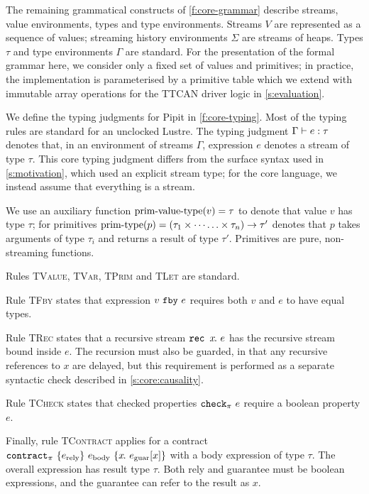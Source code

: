 The remaining grammatical constructs of \autoref{f:core-grammar} describe streams, value environments, types and type environments.
Streams $V$ are represented as a sequence of values; streaming history environments $\Sigma$ are streams of heaps.
Types $\tau$ and type environments $\Gamma$ are standard.
For the presentation of the formal grammar here, we consider only a fixed set of values and primitives; in practice, the implementation is parameterised by a primitive table which we extend with immutable array operations for the TTCAN driver logic in \autoref{s:evaluation}.



We define the typing judgments for Pipit in \autoref{f:core-typing}.
Most of the typing rules are standard for an unclocked Lustre.
The typing judgment $\Gamma \vdash e : \tau$ denotes that, in an environment of streams $\Gamma$, expression $e$ denotes a stream of type $\tau$.
This core typing judgment differs from the surface syntax used in \autoref{s:motivation}, which used an explicit stream type; for the core language, we instead assume that everything is a stream.

We use an auxiliary function $\text{prim-value-type}(v) = \tau$ to denote that value $v$ has type $\tau$; for primitives $\text{prim-type}(p) = (\tau_1 \times \cdots \hdots \times \tau_n) \to \tau'$ denotes that $p$ takes arguments of type $\tau_i$ and returns a result of type $\tau'$.
Primitives are pure, non-streaming functions.

Rules \textsc{TValue}, \textsc{TVar}, \textsc{TPrim} and \textsc{TLet} are standard.

Rule \textsc{TFby} states that expression $v~\texttt{fby}~e$ requires both $v$ and $e$ to have equal types.

Rule \textsc{TRec} states that a recursive stream $\texttt{rec~} x\hspace{-0.1em}.~e$ has the recursive stream bound inside $e$.
The recursion must also be guarded, in that any recursive references to $x$ are delayed, but this requirement is performed as a separate syntactic check described in \autoref{s:core:causality}.

Rule \textsc{TCheck} states that checked properties $\texttt{check}_{\pi}~e$ require a boolean property $e$.

Finally, rule \textsc{TContract} applies for a contract $\texttt{contract}_{\pi}~\{e_{\text{rely}}\}~e_{\text{body}}~\{x\hspace{-0.1em}.~e_{\text{guar}}[x]\}$ with a body expression of type $\tau$.
The overall expression has result type $\tau$.
Both rely and guarantee must be boolean expressions, and the guarantee can refer to the result as $x$.

